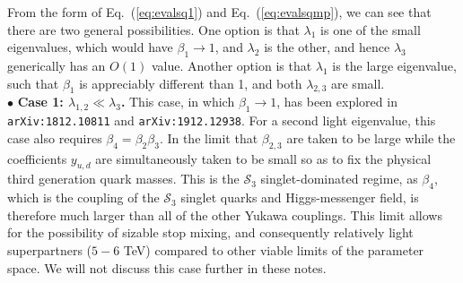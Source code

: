 \documentclass[12pt]{article}
\begin{document}
 From the form of Eq.~(\ref{eq:evalsq1}) and Eq.~(\ref{eq:evalsqmp}), we can see that there are two general possibilities.  One option is that $\lambda_1$ is one of the small eigenvalues, which would have $\beta_1\rightarrow 1$, and $\lambda_2$ is the other, and hence $\lambda_3$ generically has an $O(1)$ value.  Another option is that $\lambda_1$ is the large eigenvalue, such that $\beta_1$ is appreciably different than 1, and both $\lambda_{2,3}$ are small.\\
 
\noindent $\bullet$ {\bf Case 1: $\lambda_{1,2}\ll \lambda_3$.}  This case, in which $\beta_1\rightarrow 1$, has been explored in {\tt arXiv:1812.10811} and {\tt arXiv:1912.12938}. For a second light eigenvalue, this case also requires $\beta_4=\beta_2\beta_3$.  In the limit that $\beta_{2,3}$ are taken to be large while the coefficients $y_{u,d}$ are simultaneously taken to be small so as to fix the physical third generation quark masses.  This is the $\mathcal{S}_3$ singlet-dominated regime, as $\beta_4$, which is the coupling of the $\mathcal{S}_3$ singlet quarks and Higgs-messenger field, is therefore much larger than all of the other Yukawa couplings.  This limit allows for the possibility of sizable stop mixing, and consequently relatively light superpartners ($5-6$ TeV) compared to other viable limits of the parameter space.  We will not discuss this case further in these notes. \\
\end{document}
